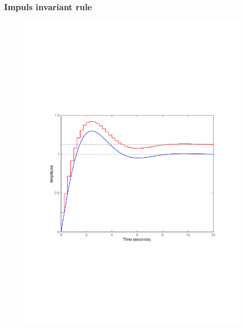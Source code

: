 \begin{frame}
	\frametitle{Impuls invariant rule}
	\vspace{-0.7em}
	\begin{figure}
		\centering
		\includegraphics[width=0.85\linewidth]{vb3}
	\end{figure}
\end{frame}

